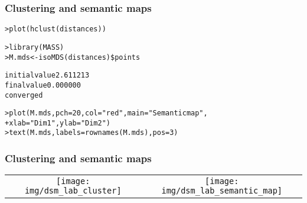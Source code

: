 \begin{frame}[fragile]
  \frametitle{Clustering and semantic maps}

\ungap
\begin{alltt}\small
{}
> plot(hclust(distances))

> library(MASS)
> M.mds <- isoMDS(distances)\$points \begin{Rout}
initial  value 2.611213 
final  value 0.000000 
converged \end{Rout}

> plot(M.mds, pch=20, col="red", main="Semantic map", 
+             xlab="Dim 1", ylab="Dim 2")
> text(M.mds, labels=rownames(M.mds), pos=3)
\end{alltt}
\end{frame}

\begin{frame}[c]
  \frametitle{Clustering and semantic maps}

  \begin{tabular}{c c}
    \texttt{[image: img/dsm\_lab\_cluster]}
    &
    \texttt{[image: img/dsm\_lab\_semantic\_map]}
  \end{tabular}
\end{frame}

